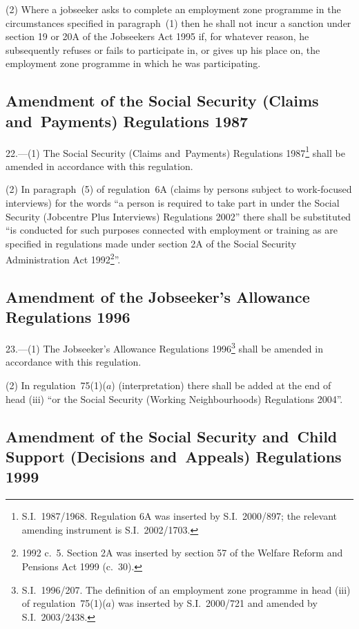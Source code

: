 \documentclass[12pt,a4paper]{article}
\begin{document}
(2) Where a jobseeker asks to complete an employment zone programme in the circumstances specified in paragraph~(1) then he shall not incur a sanction under section 19 or 20A of the Jobseekers Act 1995 if, for whatever reason, he subsequently refuses or fails to participate in, or gives up his place on, the employment zone programme in which he was participating.

\subsection[22. Amendment of the Social Security (Claims and~Payments) Regulations 1987]{Amendment of the Social Security (Claims and~Payments) Regulations 1987}

22.---(1)  The Social Security (Claims and~Payments) Regulations 1987\footnote{S.I.~1987/1968. Regulation 6A was inserted by S.I.~2000/897; the relevant amending instrument is S.I.~2002/1703.} shall be amended in accordance with this regulation.

(2) In paragraph~(5) of regulation~6A (claims by persons subject to work-focused interviews) for the words “a person is required to take part in under the Social Security (Jobcentre Plus Interviews) Regulations 2002” there shall be substituted “is conducted for such purposes connected with employment or training as are specified in regulations made under section 2A of the Social Security Administration Act 1992\footnote{1992 c.~5. Section 2A was inserted by section 57 of the Welfare Reform and Pensions Act 1999 (c.~30).}”.

\subsection[23. Amendment of the Jobseeker’s Allowance Regulations 1996]{Amendment of the Jobseeker’s Allowance Regulations 1996}

23.---(1)  The Jobseeker’s Allowance Regulations 1996\footnote{S.I.~1996/207. The definition of an employment zone programme in head (iii) of regulation~75(1)($a$) was inserted by S.I.~2000/721 and amended by S.I.~2003/2438.} shall be amended in accordance with this regulation.

(2) In regulation~75(1)($a$)  (interpretation) there shall be added at the end of head (iii)  “or the Social Security (Working Neighbourhoods) Regulations 2004”.

\subsection[24. Amendment of the Social Security and~Child Support (Decisions and~Appeals) Regulations 1999]{Amendment of the Social Security and~Child Support (Decisions and~Appeals) Regulations 1999}
\end{document}
